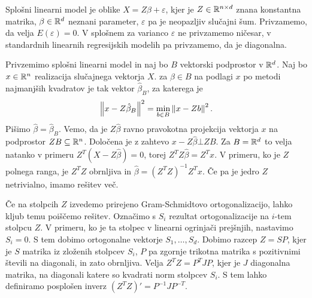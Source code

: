 
Splošni linearni model je oblike $X = Z \beta + \varepsilon$, kjer je $Z \in
\mathbb{R}^{n \times d}$ znana konstantna matrika, $\beta \in \mathbb{R}^d$ neznani parameter,
$\varepsilon$ pa je neopazljiv slučajni šum.
Privzamemo, da velja $E(\varepsilon) = 0$.
V splošnem za varianco $\varepsilon$ ne privzamemo ničesar, v standardnih
linearnih regresijskih modelih pa privzamemo, da je diagonalna.

Privzemimo splošni linearni model in naj bo $B$ vektorski podprostor v $\mathbb{R}^d$.
Naj bo $x \in \mathbb{R}^n$ realizacija slučajnega vektorja $X$.
 za $\beta \in B$ na podlagi $x$ po metodi najmanjših
kvadratov je tak vektor $\hat{\beta}_B$, za katerega je
\[
  \left\lVert x - Z \hat{\beta}_B\right\rVert^2 = \min_{b \in B} \left\lVert x - Z b\right\rVert^2.
\]
Pišimo $\hat{\beta} = \hat{\beta}_B$.
Vemo, da je $Z \hat{\beta}$ ravno pravokotna projekcija vektorja $x$ na
podprostor $Z B \subseteq \mathbb{R}^n$.
Določena je z zahtevo $x - Z \hat{\beta} \bot Z B$.
Za $B = \mathbb{R}^d$ to velja natanko v primeru $Z^T (X - Z \hat{\beta}) = 0$, torej
$Z^T Z \hat{\beta} = Z^T x$.
V primeru, ko je $Z$ polnega ranga, je $Z^T Z$ obrnljiva in $\hat{\beta} = (Z^T
Z)^{-1} Z^T x$.
Če pa je jedro $Z$ netrivialno, imamo rešitev več.

Če na stolpcih $Z$ izvedemo prirejeno Gram-Schmidtovo ortogonalizacijo, lahko
kljub temu poiščemo rešitev.
Označimo s $S_i$ rezultat ortogonalizacije na $i$-tem stolpcu $Z$.
V primeru, ko je ta stolpec v linearni ogrinjači prejšnjih, nastavimo $S_i = 0$.
S tem dobimo ortogonalne vektorje $S_1, \ldots, S_d$.
Dobimo razcep $Z = SP$, kjer je $S$ matrika iz zloženih stolpcev $S_i$, $P$ pa
zgornje trikotna matrika s pozitivnimi števili na diagonali, in zato obrnljiva.
Velja $Z^T Z = P^T J P$, kjer je $J$ diagonalna matrika, na diagonali katere so
kvadrati norm stolpcev $S_i$.
S tem lahko definiramo posplošen inverz $(Z^T Z)' = P^{-1} J P^{-T}$.

